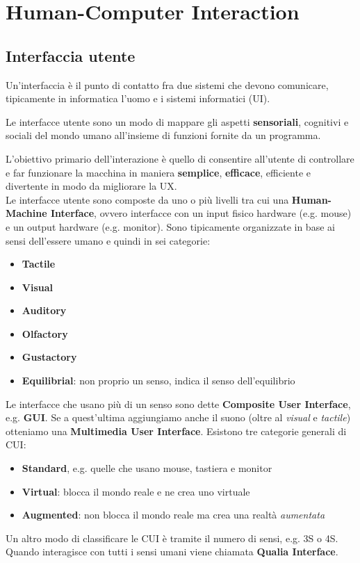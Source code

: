\newpage
\section{Human-Computer Interaction}
\subsection{Interfaccia utente}
Un'interfaccia è il punto di contatto fra due sistemi che devono comunicare, tipicamente in informatica l'uomo e i sistemi informatici (UI).
\begin{definition}
	Le interfacce utente sono un modo di mappare gli aspetti \textbf{sensoriali}, cognitivi e sociali del mondo umano all'insieme di funzioni fornite da un programma.
\end{definition}
L'obiettivo primario dell'interazione è quello di consentire all'utente di controllare e far funzionare la macchina in maniera \textbf{semplice}, \textbf{efficace}, efficiente e divertente in modo da migliorare la UX.\\

Le interfacce utente sono composte da uno o più livelli tra cui una \textbf{Human-Machine Interface}, ovvero interfacce con un input fisico hardware (e.g. mouse) e un output hardware (e.g. monitor). Sono tipicamente organizzate in base ai sensi dell'essere umano e quindi in sei categorie:
\begin{itemize}
	\item \textbf{Tactile}
	\item \textbf{Visual}
	\item \textbf{Auditory}
	\item \textbf{Olfactory}
	\item \textbf{Gustactory}
	\item \textbf{Equilibrial}: non proprio un senso, indica il senso dell'equilibrio
\end{itemize}
Le interfacce che usano più di un senso sono dette \textbf{Composite User Interface}, e.g. \textbf{GUI}. Se a quest'ultima aggiungiamo anche il suono (oltre al \textit{visual} e \textit{tactile}) otteniamo una \textbf{Multimedia User Interface}. Esistono tre categorie generali di CUI:
\begin{itemize}
	\item \textbf{Standard}, e.g. quelle che usano mouse, tastiera e monitor
	\item \textbf{Virtual}: blocca il mondo reale e ne crea uno virtuale
	\item \textbf{Augmented}: non blocca il mondo reale ma crea una realtà \textit{aumentata}
\end{itemize}
Un altro modo di classificare le CUI è tramite il numero di sensi, e.g. 3S o 4S. Quando interagisce con tutti i sensi umani viene chiamata \textbf{Qualia Interface}.

